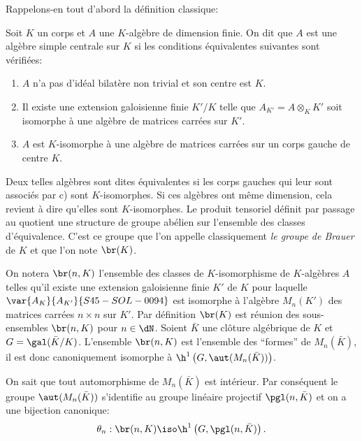 Rappelons-en tout d'abord la définition classique:





\begin{definitiondotdash}\label{I:3-1-1}
Soit $K$ un corps et $A$ une $K$-algèbre de dimension finie. On dit que $A$ 
est une algèbre simple centrale sur $K$ si les conditions équivalentes 
suivantes sont vérifiées:
\begin{enumerate}[\indent a)]
  \item $A$ n'a pas d'idéal bilatère non trivial et son centre est $K$. 
  \item Il existe une extension galoisienne finie $K'/K$ telle que 
    $A_{K'} = A\otimes_K K'$ soit isomorphe à une algèbre de matrices 
    carrées sur $K'$.
  \item $A$ est $K$-isomorphe à une algèbre de matrices carrées sur un corps 
    gauche de centre $K$.
\end{enumerate}
\end{definitiondotdash}

Deux telles algèbres sont dites équivalentes si les corps gauches qui 
leur sont associés par c) sont $K$-isomorphes. Si ces algèbres ont 
même dimension, cela revient à dire qu'elles sont $K$-isomorphes. Le 
produit tensoriel définit par passage au quotient une structure de groupe 
abélien sur l'ensemble des classes d'équivalence. C'est ce groupe que l'on 
appelle classiquement \emph{le groupe de Brauer} de $K$ et que l'on note 
$\br(K)$. 





\begin{sourceinline}\label{I:3-1-2}
On notera $\br(n,K)$ l'ensemble des classes de $K$-isomorphisme de 
$K$-algèbres $A$ telles qu'il existe une extension galoisienne finie $K'$ de 
$K$ pour laquelle $\var{A_K}{A_{K'}}{S45-SOL-0094}$ est isomorphe à l'algèbre $M_n(K')$ des matrices 
carrées $n\times n$ sur $K'$. Par définition $\br(K)$ est réunion des 
sous-ensembles $\br(n,K)$ pour $n\in\dN$. Soient $\bar K$ une clôture 
algébrique de $K$ et $G=\gal(\bar K/K)$. L'ensemble $\br(n,K)$ est 
l'ensemble des ``formes'' de $M_n(\bar K)$, il est donc canoniquement 
isomorphe à $\h^1\left(G,\aut(M_n(\bar K))\right)$. 
\end{sourceinline}

On sait que tout automorphisme de $M_n(\bar K)$ est intérieur. Par 
conséquent le groupe $\aut(M_n(\bar K))$ s'identifie au groupe linéaire 
projectif $\pgl(n,\bar K)$ et on a une bijection canonique:
\[
  \theta_n : \br(n,K) \iso \h^1\left(G,\pgl(n,\bar K)\right)\text{.}
\]


